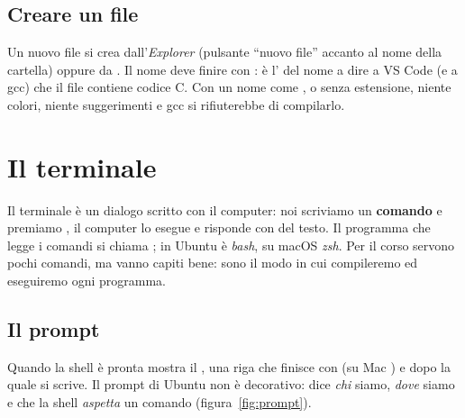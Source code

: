 \subsection{Creare un file}

Un nuovo file si crea dall'\textit{Explorer} (pulsante “nuovo file”
accanto al nome della cartella) oppure da . Il nome
deve finire con \textbf{}: è l' del nome a dire a
VS Code (e a gcc) che il file contiene codice C. Con un nome come
, o senza estensione, niente colori, niente suggerimenti e
gcc si rifiuterebbe di compilarlo.


\section{Il terminale}

Il terminale è un dialogo scritto con il computer: noi scriviamo un
\textbf{comando} e premiamo , il computer lo esegue e risponde
con del testo. Il programma che legge i comandi si chiama ; in
Ubuntu è \textit{bash}, su macOS \textit{zsh}. Per il corso servono pochi
comandi, ma vanno capiti bene: sono il modo in cui compileremo ed eseguiremo
ogni programma.

\subsection{Il prompt}

Quando la shell è pronta mostra il , una riga che finisce con
\code{\$} (su Mac \code{\%}) e dopo la quale si scrive. Il prompt di
Ubuntu non è decorativo: dice \textit{chi} siamo, \textit{dove} siamo e
che la shell \textit{aspetta} un comando (figura~\ref{fig:prompt}).

